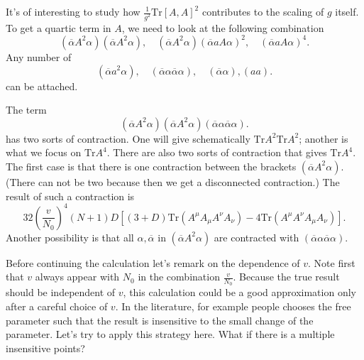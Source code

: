 
It's of interesting to study how $\frac{1}{g^2}\mathrm{Tr}[A,A]^2$
contributes to the scaling of $g$ itself.
To get a quartic term in $A$, we need to look at the following combination
\[
	(\overline{\alpha}A^2\alpha)(\overline{\alpha}A^2\alpha),\quad
	(\overline{\alpha}A^2\alpha)(\overline{\alpha}a A\alpha)^2,\quad
	(\overline{\alpha}aA\alpha)^4
.\] 
Any number of
\[
	(\overline{\alpha}a^2\alpha),\quad (\overline{\alpha}\alpha \overline{\alpha}\alpha),\quad (\overline{\alpha}\alpha),(aa)
.\] 
can be attached.

The term
\[
	(\overline{\alpha}A^2\alpha)(\overline{\alpha}A^2\alpha)
	(\overline{\alpha}\alpha \overline{\alpha}\alpha)
.\] 
has two sorts of contraction.
One will give schematically $\mathrm{Tr}A^2 \mathrm{Tr}A^2$;
another is what we focus on $\mathrm{Tr}A^4$.
There are also two sorts of contraction that gives $\mathrm{Tr}A^4$.
The first case is that there is one contraction between the brackets
$(\overline{\alpha}A^2\alpha)$.
(There can not be two because then we get a disconnected contraction.)
The result of such a contraction is
\[
32 \left( \frac{v}{N_0} \right)^4(N+1)D
\left[ (3+D)\mathrm{Tr}(A^\mu A_\mu A^\nu A_\nu) 
- 4 \mathrm{Tr}(A^\mu A^\nu A_\mu A_\nu) \right] 
.\] 
Another possibility is that
all $\alpha,\overline{\alpha}$ in $(\overline{\alpha}A^2\alpha)$
are contracted with $(\overline{\alpha}\alpha \overline{\alpha}\alpha)$.

Before continuing the calculation
let's remark on the dependence of $v$.
Note first that $v$ always appear with $N_0$ in the combination $\frac{v}{N_0}$.
Because the true result should be independent of $v$,
this calculation could be a good approximation only after a careful choice of $v$.
In the literature, for example
people chooses the free parameter such that
the result is insensitive to the small change of the parameter.
Let's try to apply this strategy here.
What if there is a multiple insensitive points?
